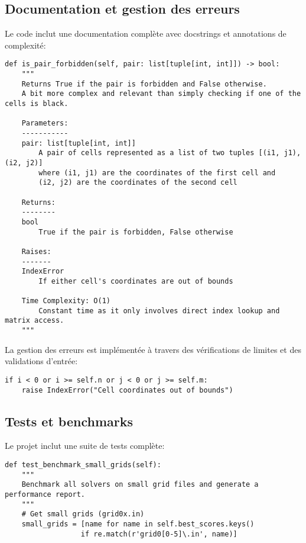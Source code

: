 \documentclass[11pt, a4paper]{article}
\begin{document}
\subsection{Documentation et gestion des erreurs}

Le code inclut une documentation complète avec docstrings et annotations de complexité:

\begin{lstlisting}[caption=Exemple de documentation]
def is_pair_forbidden(self, pair: list[tuple[int, int]]) -> bool:
    """
    Returns True if the pair is forbidden and False otherwise.
    A bit more complex and relevant than simply checking if one of the cells is black.

    Parameters:
    -----------
    pair: list[tuple[int, int]]
        A pair of cells represented as a list of two tuples [(i1, j1), (i2, j2)]
        where (i1, j1) are the coordinates of the first cell and
        (i2, j2) are the coordinates of the second cell

    Returns:
    --------
    bool
        True if the pair is forbidden, False otherwise

    Raises:
    -------
    IndexError
        If either cell's coordinates are out of bounds
        
    Time Complexity: O(1)
        Constant time as it only involves direct index lookup and matrix access.
    """
\end{lstlisting}

La gestion des erreurs est implémentée à travers des vérifications de limites et des validations d'entrée:

\begin{lstlisting}[caption=Exemple de gestion d'erreur]
if i < 0 or i >= self.n or j < 0 or j >= self.m:
    raise IndexError("Cell coordinates out of bounds")
\end{lstlisting}

\subsection{Tests et benchmarks}

Le projet inclut une suite de tests complète:

\begin{lstlisting}[caption=Exemple de test de benchmark]
def test_benchmark_small_grids(self):
    """
    Benchmark all solvers on small grid files and generate a performance report.
    """
    # Get small grids (grid0x.in)
    small_grids = [name for name in self.best_scores.keys() 
                  if re.match(r'grid0[0-5]\.in', name)]
\end{lstlisting}
\end{document}
